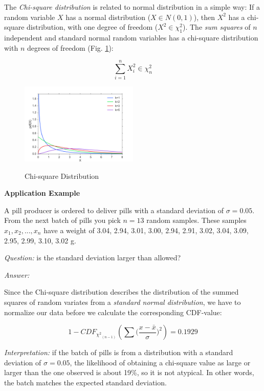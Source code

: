 The \emph{Chi-square distribution} is related to normal distribution in a simple way: If a random variable $X$ has a normal distribution ($X \in N(0,1)$), then $X^2$ has a chi-square distribution, with one degree of freedom ($X^2 \in \chi_{1}^2$). The \emph{sum squares }of $n$ independent and standard normal random variables has a chi-square distribution with $n$ degrees of freedom (Fig. \ref{fig:chi2}):

\begin{equation}
    \sum\limits_{i = 1}^n {X_i^2} \in \chi_{n}^2
\end{equation}


\begin{figure}
  \centering
  \includegraphics[width=0.5\textwidth]{../Images/dist_chi2.png}\\
  \caption{Chi-square Distribution}
  \label{fig:chi2}
\end{figure}

\textbf{Application Example}

A pill producer is ordered to deliver pills with a standard deviation of $\sigma=0.05$. From the next batch of pills you pick $n=13$ random samples. These samples $x_1, x_2, . . . , x_n$ have a weight of
3.04, 2.94, 3.01, 3.00, 2.94, 2.91, 3.02, 3.04, 3.09, 2.95, 2.99, 3.10, 3.02 g.

\emph{Question:} is the standard deviation larger than allowed?

\emph{Answer:}

Since the Chi-square distribution describes the distribution of the summed squares of random variates from a \emph{standard normal distribution}, we have to normalize our data before we calculate the corresponding CDF-value:

\begin{equation}
  1 - CD{F_{{\chi ^2}_{(n - 1)}}}\left( {\sum {(\frac{{x - \bar x}}{\sigma }} {)^2}} \right) = 0.1929
\end{equation}

\emph{Interpretation:} if the batch of pills is from a distribution with a standard deviation of $\sigma=0.05$, the likelihood of obtaining a chi-square value as large or larger than the one observed is about 19\%, so it is not atypical. In other words, the batch matches the expected standard deviation.

